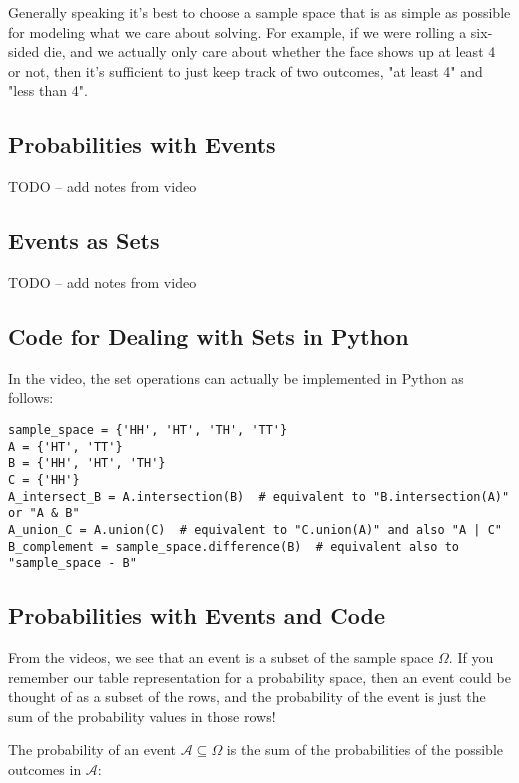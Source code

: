 \documentclass[6008notes.tex]{subfiles}
\begin{document}
Generally speaking it's best to choose a sample space that is as simple as possible for modeling what we care about solving. For example, if we were rolling a six-sided die, and we actually only care about whether the face shows up at least 4 or not, then it's sufficient to just keep track of two outcomes, "at least 4" and "less than 4".

\subsection{Probabilities with Events}

TODO -- add notes from video

\subsection{Events as Sets}

TODO -- add notes from video

\subsection{Code for Dealing with Sets in Python}

In the video, the set operations can actually be implemented in Python as follows:

\begin{lstlisting}
sample_space = {'HH', 'HT', 'TH', 'TT'}
A = {'HT', 'TT'}
B = {'HH', 'HT', 'TH'}
C = {'HH'}
A_intersect_B = A.intersection(B)  # equivalent to "B.intersection(A)" or "A & B"
A_union_C = A.union(C)  # equivalent to "C.union(A)" and also "A | C"
B_complement = sample_space.difference(B)  # equivalent also to "sample_space - B"
\end{lstlisting}

\subsection{Probabilities with Events and Code}

From the videos, we see that an event is a subset of the sample space $\Omega$. If you remember our table representation for a probability space, then an event could be thought of as a subset of the rows, and the probability of the event is just the sum of the probability values in those rows!

The probability of an event $\mathcal{A}\subseteq \Omega$ is the sum of the probabilities of the possible outcomes in $\mathcal{A}$:
\end{document}
